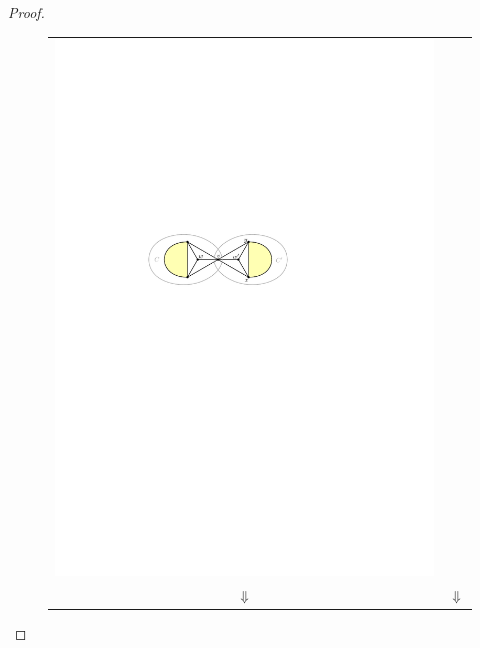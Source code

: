 \documentclass{article}
\theoremstyle{definition}
\begin{document}
\begin{proof}
\begin{figure}[htpb]
\begin{tabular}{cc}
      \includegraphics[page=3]{figs/isolated} \\
      $\Downarrow$ & $\Downarrow$ \\

\end{tabular}
\end{figure}
\end{proof}
\end{document}
